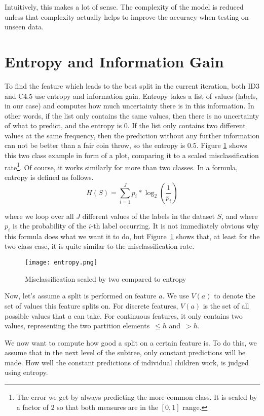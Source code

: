 \documentclass[a4paper]{article}
\begin{document}
Intuitively, this makes a lot of sense. The complexity of the model is reduced unless that complexity actually helps to improve the accuracy when testing on unseen data.

\section{Entropy and Information Gain}
\label{sec:entropy}

To find the feature which leads to the best split in the current iteration, both ID3 and C4.5 use entropy and information gain. Entropy takes a list of values (labels, in our case) and computes how much uncertainty there is in this information. In other words, if the list only contains the same values, then there is no uncertainty of what to predict, and the entropy is $0$. If the list only contains two different values at the same frequency, then the prediction without any further information can not be better than a fair coin throw, so the entropy is $0.5$. Figure \ref{fig:entropy} shows this two class example in form of a plot, comparing it to a scaled misclassification rate\footnote{The error we get by always predicting the more common class. It is scaled by a factor of $2$ so that both measures are in the $[0, 1]$ range.}. Of course, it works similarly for more than two classes. In a formula, entropy is defined as follows.
\[
	H(S) = \sum\limits_{i = 1}^J p_i * \log_2\left(\frac{1}{p_i}\right)
\]

\noindent where we loop over all $J$ different values of the labels in the dataset $S$, and where $p_i$ is the probability of the $i$-th label occurring.  It is not immediately obvious why this formula does what we want it to do, but Figure~\ref{fig:entropy} shows that, at least for the two class case, it is quite similar to the misclassification rate.

\begin{figure}[h]
	\texttt{[image: entropy.png]}
    \caption{Misclassification scaled by two compared to entropy}
    \label{fig:entropy}
\end{figure}

Now, let's assume a split is performed on feature $a$.
We use $V(a)$ to denote the set of values this feature splits on. For discrete features, $V(a)$ is the set of all possible values that $a$ can take. For continuous features, it only contains two values, representing the two partition elements~$\le h$ and~$> h$.

We now want to compute how good a split on a certain feature is.
To do this, we assume that in the next level of the subtree, only constant predictions will be made. How well the constant predictions of individual children work, is judged using entropy.
\end{document}
